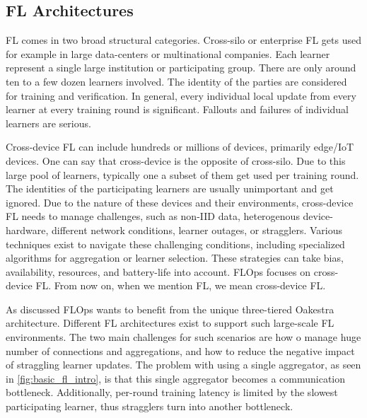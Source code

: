 \subsection{FL Architectures}

FL comes in two broad structural categories.
Cross-silo or enterprise FL gets used for example in large data-centers or multinational companies.
Each learner represent a single large institution or participating group.
There are only around ten to a few dozen learners involved.
The identity of the parties are considered for training and verification.
In general, every individual local update from every learner at every training round is significant.
Fallouts and failures of individual learners are serious.

Cross-device FL can include hundreds or millions of devices, primarily edge/IoT devices.
One can say that cross-device is the opposite of cross-silo.
Due to this large pool of learners, typically one a subset of them get used per training round.
The identities of the participating learners are usually unimportant and get ignored.
Due to the nature of these devices and their environments, cross-device FL
needs to manage challenges, such as non-IID data, heterogenous device-hardware,
different network conditions, learner outages, or stragglers.
Various techniques exist to navigate these challenging conditions,
including specialized algorithms for aggregation or learner selection.
These strategies can take bias, availability, resources, and battery-life into account.
FLOps focuses on cross-device FL.
From now on, when we mention FL, we mean cross-device FL.

As discussed FLOps wants to benefit from the unique three-tiered Oakestra \cite{paper:oakestra_usenix} architecture.
Different FL architectures exist to support such large-scale FL environments.
The two main challenges for such scenarios are how o manage huge number of connections and aggregations,
and how to reduce the negative impact of straggling learner updates.
The problem with using a single aggregator, as seen in \ref{fig:basic_fl_intro}, is
that this single aggregator becomes a communication bottleneck.
Additionally, per-round training latency is limited by the slowest participating learner,
thus stragglers turn into another bottleneck.

